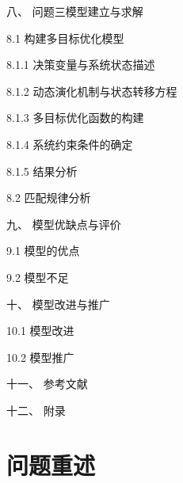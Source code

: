 \documentclass[12pt]{article}
\begin{document}
{		\noindent 八、 问题三模型建立与求解  \par
		\noindent \hspace*{2em} 8.1 构建多目标优化模型  \par
		\noindent \hspace*{4em} 8.1.1 决策变量与系统状态描述  \par
		\noindent \hspace*{4em} 8.1.2 动态演化机制与状态转移方程  \par
		\noindent \hspace*{4em} 8.1.3 多目标优化函数的构建  \par
		\noindent \hspace*{4em} 8.1.4 系统约束条件的确定  \par
		\noindent \hspace*{4em} 8.1.5 结果分析  \par
		
		\noindent \hspace*{2em} 8.2 匹配规律分析  \par
		
		\noindent 九、 模型优缺点与评价  \par
		\noindent \hspace*{2em} 9.1 模型的优点  \par
		\noindent \hspace*{2em} 9.2 模型不足  \par
		
		\noindent 十、 模型改进与推广  \par
		\noindent \hspace*{2em} 10.1 模型改进  \par
		\noindent \hspace*{2em} 10.2 模型推广  \par
		
		\noindent 十一、 参考文献  \par
		\noindent 十二、 附录  \par
	}
	
	\newpage
	
	\setcounter{page}{1}
	
	\section{问题重述}
\end{document}
